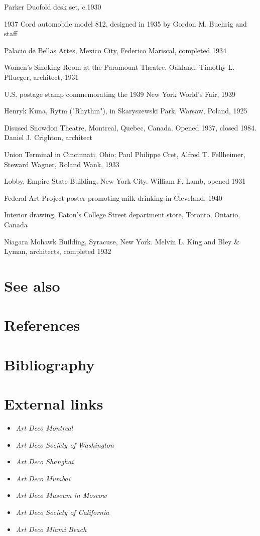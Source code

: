 Parker Duofold desk set, c.1930

1937 Cord automobile model 812, designed in 1935 by Gordon M. Buehrig
and staff

Palacio de Bellas Artes, Mexico City, Federico Mariscal, completed 1934

Women's Smoking Room at the Paramount Theatre, Oakland. Timothy L.
Pflueger, architect, 1931

U.S. postage stamp commemorating the 1939 New York World's Fair, 1939

Henryk Kuna, Rytm ("Rhythm"), in Skaryszewski Park, Warsaw, Poland, 1925

Disused Snowdon Theatre, Montreal, Quebec, Canada. Opened 1937, closed
1984. Daniel J. Crighton, architect

Union Terminal in Cincinnati, Ohio; Paul Philippe Cret, Alfred T.
Fellheimer, Steward Wagner, Roland Wank, 1933

Lobby, Empire State Building, New York City. William F. Lamb, opened
1931

Federal Art Project poster promoting milk drinking in Cleveland, 1940

Interior drawing, Eaton's College Street department store, Toronto,
Ontario, Canada

Niagara Mohawk Building, Syracuse, New York. Melvin L. King and Bley \&
Lyman, architects, completed 1932

\section{See also}\label{see-also}

\section{References}\label{references}

\section{Bibliography}\label{bibliography}

\section{External links}\label{external-links}

\begin{itemize}
\item
  \emph{Art Deco Montreal}
\item
  \emph{Art Deco Society of Washington}
\item
  \emph{Art Deco Shanghai}
\item
  \emph{Art Deco Mumbai}
\item
  \emph{Art Deco Museum in Moscow}
\item
  \emph{Art Deco Society of California}
\item
  \emph{Art Deco Miami Beach}
\end{itemize}


